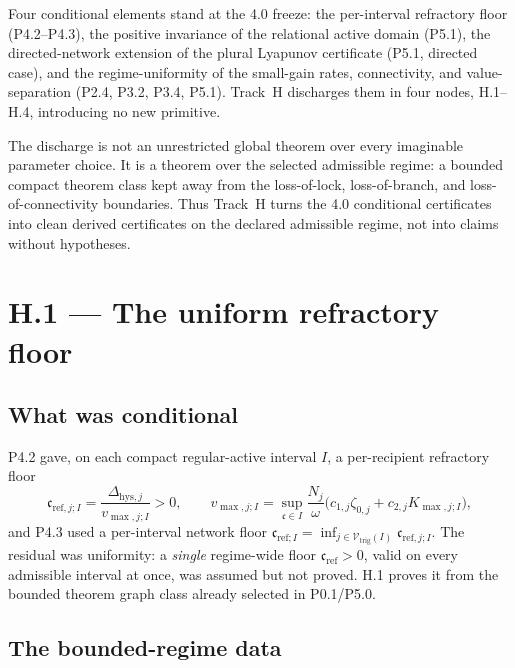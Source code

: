 \documentclass[11pt,a4paper]{article}
\newcommand{\cint}{\ensuremath{\mathfrak c}}
\theoremstyle{definition}
\theoremstyle{plain}
\theoremstyle{remark}
\begin{document}
Four conditional elements stand at the 4.0 freeze: the per-interval refractory floor
(P4.2--P4.3), the positive invariance of the relational active domain (P5.1), the
directed-network extension of the plural Lyapunov certificate (P5.1, directed case), and the
regime-uniformity of the small-gain rates, connectivity, and value-separation (P2.4, P3.2,
P3.4, P5.1). Track~H discharges them in four nodes, H.1--H.4, introducing no new primitive.

The discharge is not an unrestricted global theorem over every imaginable parameter choice. It
is a theorem over the selected admissible regime: a bounded compact theorem class kept away
from the loss-of-lock, loss-of-branch, and loss-of-connectivity boundaries. Thus Track~H turns
the 4.0 conditional certificates into clean derived certificates on the declared admissible
regime, not into claims without hypotheses.

\section{H.1 --- The uniform refractory floor}

\subsection{What was conditional}

P4.2 gave, on each compact regular-active interval \(I\), a per-recipient refractory floor
\[
\mathfrak c_{\mathrm{ref},j;I}
=
\frac{\Delta_{\mathrm{hys},j}}{v_{\max,j;I}}>0,
\qquad
v_{\max,j;I}
=
\sup_{\cint\in I}\frac{N_j}{\omega}\bigl(c_{1,j}\zeta_{0,j}+c_{2,j}K_{\max,j;I}\bigr),
\]
and P4.3 used a per-interval network floor
\(\mathfrak c_{\mathrm{ref};I}=\inf_{j\in\mathcal V_{\mathrm{trig}}(I)}\mathfrak c_{\mathrm{ref},j;I}\).
The residual was uniformity: a \emph{single} regime-wide floor
\(\mathfrak c_{\mathrm{ref}}>0\), valid on every admissible interval at once, was assumed but
not proved. H.1 proves it from the bounded theorem graph class already selected in
P0.1/P5.0.

\subsection{The bounded-regime data}
\end{document}
